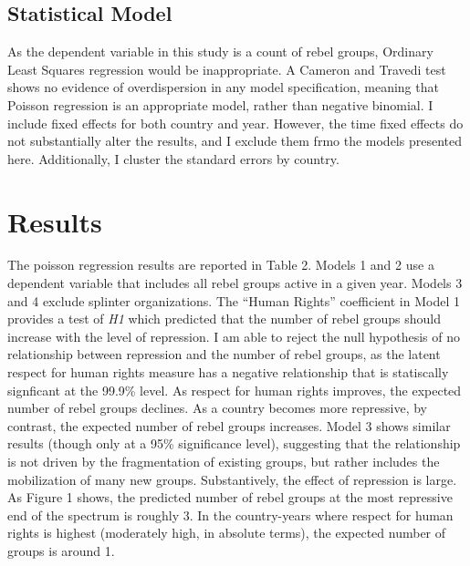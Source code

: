 \documentclass[12pt,]{book}
\begin{document}
\subsection{Statistical Model}\label{statistical-model}

As the dependent variable in this study is a count of rebel groups,
Ordinary Least Squares regression would be inappropriate. A Cameron and
Travedi test shows no evidence of overdispersion in any model
specification, meaning that Poisson regression is an appropriate model,
rather than negative binomial. I include fixed effects for both country
and year. However, the time fixed effects do not substantially alter the
results, and I exclude them frmo the models presented here.
Additionally, I cluster the standard errors by country.

\section{Results}\label{results}

The poisson regression results are reported in Table 2. Models 1 and 2
use a dependent variable that includes all rebel groups active in a
given year. Models 3 and 4 exclude splinter organizations. The ``Human
Rights'' coefficient in Model 1 provides a test of \emph{H1} which
predicted that the number of rebel groups should increase with the level
of repression. I am able to reject the null hypothesis of no
relationship between repression and the number of rebel groups, as the
latent respect for human rights measure has a negative relationship that
is statiscally signficant at the 99.9\% level. As respect for human
rights improves, the expected number of rebel groups declines. As a
country becomes more repressive, by contrast, the expected number of
rebel groups increases. Model 3 shows similar results (though only at a
95\% significance level), suggesting that the relationship is not driven
by the fragmentation of existing groups, but rather includes the
mobilization of many new groups. Substantively, the effect of repression
is large. As Figure 1 shows, the predicted number of rebel groups at the
most repressive end of the spectrum is roughly 3. In the country-years
where respect for human rights is highest (moderately high, in absolute
terms), the expected number of groups is around 1.
\end{document}
